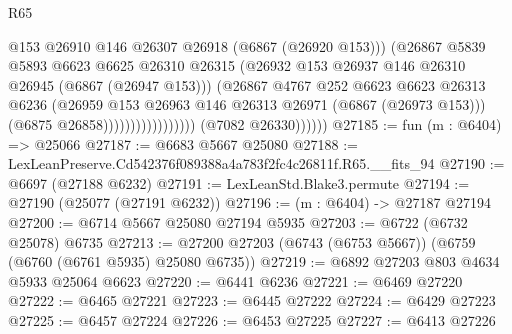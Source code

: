 \begin{lexlean}{R65}
\begin{coremodule}
{                                            @153
                                            @26910
                                            @146
                                            @26307
                                            @26918
                                            (@6867 (@26920 @153)))
                                          (@26867
                                            @5839
                                            @5893
                                            @6623
                                            @6625
                                            @26310
                                            @26315
                                            (@26932
                                              @153
                                              @26937
                                              @146
                                              @26310
                                              @26945
                                              (@6867 (@26947 @153)))
                                            (@26867
                                              @4767
                                              @252
                                              @6623
                                              @6623
                                              @26313
                                              @6236
                                              (@26959
                                                @153
                                                @26963
                                                @146
                                                @26313
                                                @26971
                                                (@6867 (@26973 @153)))
                                              (@6875 @26858)))))))))))))))))
              (@7082 @26330))))))
@27185 := fun (m : @6404) => @25066
@27187 := @6683 @5667 @25080
@27188 := LexLeanPreserve.Cd542376f089388a4a783f2fc4c26811f.R65.__fits_94
@27190 := @6697 (@27188 @6232)
@27191 := LexLeanStd.Blake3.permute
@27194 := @27190 (@25077 (@27191 @6232))
@27196 := (m : @6404) -> @27187 @27194
@27200 := @6714 @5667 @25080 @27194 @5935
@27203 := @6722 (@6732 @25078) @6735
@27213 := @27200 @27203 (@6743 (@6753 @5667)) (@6759 (@6760 (@6761 @5935) @25080 @6735))
@27219 := @6892 @27203 @803 @4634 @5933 @25064 @6623
@27220 := @6441 @6236
@27221 := @6469 @27220
@27222 := @6465 @27221
@27223 := @6445 @27222
@27224 := @6429 @27223
@27225 := @6457 @27224
@27226 := @6453 @27225
@27227 := @6413 @27226
}
\end{coremodule}
\end{lexlean}

